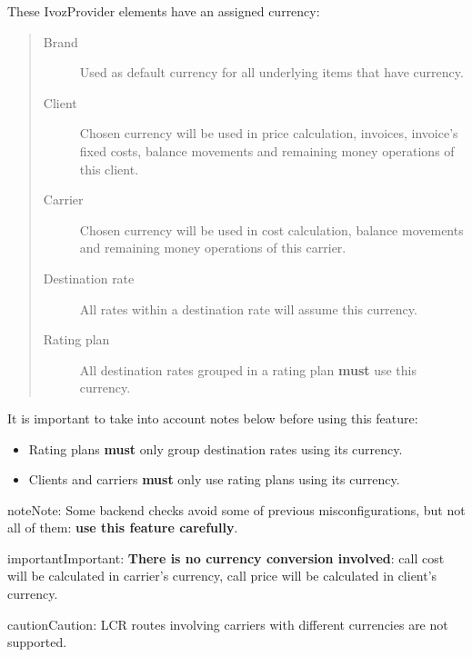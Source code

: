 \documentclass[letterpaper,10pt,english]{sphinxmanual}
\begin{document}
These IvozProvider elements have an assigned currency:
\begin{quote}
\begin{description}
\item[{Brand}] \leavevmode
Used as default currency for all underlying items that have currency.

\item[{Client}] \leavevmode
Chosen currency will be used in price calculation, invoices, invoice's fixed costs, balance movements and
remaining money operations of this client.

\item[{Carrier}] \leavevmode
Chosen currency will be used in cost calculation, balance movements and
remaining money operations of this carrier.

\item[{Destination rate}] \leavevmode
All rates within a destination rate will assume this currency.

\item[{Rating plan}] \leavevmode
All destination rates grouped in a rating plan \textbf{must} use this currency.

\end{description}
\end{quote}

It is important to take into account notes below before using this feature:
\begin{itemize}
\item {} 
Rating plans \textbf{must} only group destination rates using its currency.

\item {} 
Clients and carriers \textbf{must} only use rating plans using its currency.

\end{itemize}

\begin{notice}{note}{Note:}
Some backend checks avoid some of previous misconfigurations, but not all of them: \textbf{use this feature carefully}.
\end{notice}

\begin{notice}{important}{Important:}
\textbf{There is no currency conversion involved}: call cost will be calculated in carrier's currency, call price
will be calculated in client's currency.
\end{notice}

\begin{notice}{caution}{Caution:}
LCR routes involving carriers with different currencies are not supported.
\end{notice}
\label{administration_portal/platform/default_notification_templates:default-notification-templates}
\end{document}
